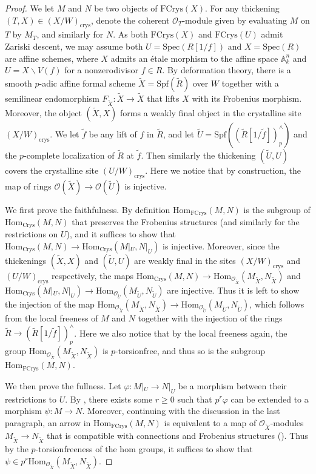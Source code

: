 \documentclass[11pt, letterpaper]{amsart}
\theoremstyle{plain}
\theoremstyle{definition}
\newcommand{\Hom}{\mathrm{Hom}}
\newcommand{\Spec}{\mathrm{Spec}}
\newcommand{\<}{\langle}
\renewcommand{\>}{\rangle}
\newcommand{\sO}{\mathcal{O}}
\newcommand{\crys}{\mathrm{crys}}
\newcommand{\FCrys}{\mathrm{FCrys}}
\begin{document}
\begin{proof}
    We let $M$ and $N$ be two objects of $\FCrys(X)$. 
	For any thickening $(T,X) \in (X/W)_\crys$, denote the coherent $\sO_T$-module given by evaluating $M$ on $T$ by $M_T$, and similarly for $N$.
	As both $\FCrys(X)$ and $\FCrys(U)$ admit Zariski descent, we may assume both $U=\Spec(R[1/f])$ and $X=\Spec(R)$ are affine schemes, where $X$ admits an \'etale morphism to the affine space $\mathbb{A}^n_k$ and $U=X\backslash V(f)$ for a nonzerodivisor $f\in R$.
	By deformation theory, there is a smooth $p$-adic affine formal scheme $\tilde{X}=\mathrm{Spf}(\tilde{R})$ over $W$ together with a semilinear endomorphism $F_{\tilde{X}}:\tilde{X}\to \tilde{X}$ that lifts $X$ with its Frobenius morphism.
	Moreover, the object $(\tilde{X},X)$ forms a weakly final object in the crystalline site $(X/W)_\crys$.
	We let $\tilde{f}$ be any lift of $f$ in $\tilde{R}$, and let $\tilde{U}=\mathrm{Spf}((\tilde{R}[1/\tilde{f}])^\wedge_p)$ and the $p$-complete localization of $\tilde{R}$ at $\tilde{f}$.
	Then similarly the thickening $(\tilde{U},U)$ covers the crystalline site $(U/W)_\crys$.
	Here we notice that by construction, the map of rings $\sO(\tilde{X})\to \sO(\tilde{U})$ is injective.
	
	We first prove the faithfulness. By definition $\Hom_{\FCrys}(M,N)$ is the subgroup of $\Hom_{\mathrm{Crys}}(M,N)$ that preserves the Frobenius structures (and similarly for the restrictions on $U$), and it suffices to show that $\Hom_{\mathrm{Crys}}(M,N) \to \Hom_{\mathrm{Crys}}(M|_U,N|_U)$ is injective.
	Moreover, since the thickenings $(\tilde{X},X)$ and $(\tilde{U},U)$ are weakly final in the sites $(X/W)_\crys$ and $(U/W)_\crys$ respectively, 
	the maps $\Hom_{\mathrm{Crys}}(M,N) \to \Hom_{\sO_{\tilde{X}}} (M_{\tilde{X}}, N_{\tilde{X}})$ and $\Hom_{\mathrm{Crys}}(M|_U,N|_U) \to \Hom_{\sO_{\tilde{U}}} (M_{\tilde{U}}, N_{\tilde{U}})$  are injective.
	Thus it is left to show the injection of the map  $\Hom_{\sO_{\tilde{X}}} (M_{\tilde{X}}, N_{\tilde{X}}) \to \Hom_{\sO_{\tilde{U}}} (M_{\tilde{U}}, N_{\tilde{U}})$, which follows from the local freeness of $M$ and $N$ together with the injection of the rings $\tilde{R} \to (\tilde{R}[1/\tilde{f}])^\wedge_p$.
	Here we also notice that by the local freeness again, the group $\Hom_{\sO_{\tilde{X}}} (M_{\tilde{X}}, N_{\tilde{X}})$ is $p$-torsionfree, and thus so is the subgroup $\Hom_{\FCrys}(M,N)$.
	
	We then prove the fullness.
	Let $\varphi : M|_U \to N|_U$ be a morphism between their restrictions to $U$. 
	By \cite[Thm~2.2.3]{DK17}, there exists some $r \ge 0$ such that $p^r \varphi$ can be extended to a morphism $\psi : M \to N$. 
	Moreover,  continuing with the discussion in the last paragraph, an arrow in $\Hom_{\FCrys}(M,N)$ is equivalent to a map of $\sO_{\tilde{X}}$-modules $M_{\tilde{X}}\to N_{\tilde{X}}$ that is compatible with connections and Frobenius structures (\cite[Thm.~6.6]{BO}).
	Thus by the $p$-torsionfreeness of the hom groups, it suffices to show that $\psi \in p^r \Hom_{\sO_{\tilde{X}}}(M_{\tilde{X}}, N_{\tilde{X}})$.
	

\end{proof}
\end{document}
